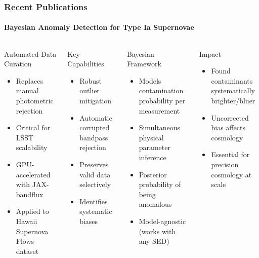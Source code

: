\documentclass[aspectratio=169]{beamer}
\begin{document}
\begin{frame}
    \frametitle{Recent Publications}
    \framesubtitle{Bayesian Anomaly Detection for Type Ia Supernovae }
    \begin{columns}
        \begin{block}{Automated Data Curation}
            \begin{itemize}
                \item Replaces manual photometric rejection
                \item Critical for LSST scalability  
                \item GPU-accelerated with JAX-bandflux
                \item Applied to Hawaii Supernova Flows dataset
            \end{itemize}
        \end{block}
        \begin{block}{Key Capabilities}
            \begin{itemize}
                \item Robust outlier mitigation
                \item Automatic corrupted bandpass rejection
                \item Preserves valid data selectively
                \item Identifies systematic biases
            \end{itemize}
        \end{block}
        \begin{block}{Bayesian Framework}
            \begin{itemize}
                \item Models contamination probability per measurement
                \item Simultaneous physical parameter inference
                \item Posterior probability of being anomalous
                \item Model-agnostic (works with any SED)
            \end{itemize}
        \end{block}
        \begin{block}{Impact}
            \begin{itemize}
                \item Found contaminants systematically brighter/bluer
                \item Uncorrected bias affects cosmology
                \item Essential for precision cosmology at scale
            \end{itemize}
        \end{block}
    \end{columns}
\end{frame}
\end{document}
